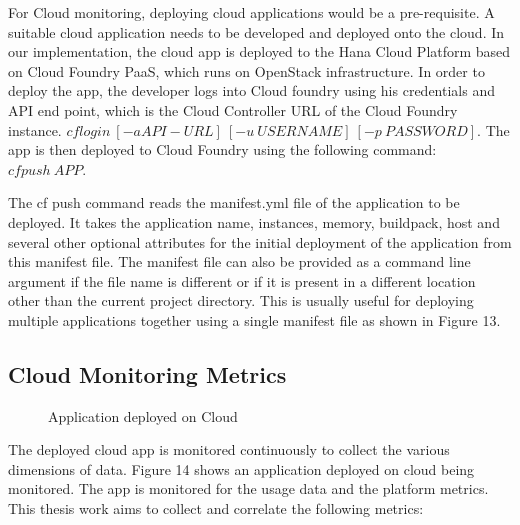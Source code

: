 \documentclass[article,type=msc,colorback,12pt,accentcolor=tud7b,table]{tudthesis}
\begin{document}
	For Cloud monitoring, deploying cloud applications would be a pre-requisite. A suitable cloud application needs to be developed and deployed onto the cloud. In our implementation, the cloud app is deployed to the Hana Cloud Platform based on Cloud Foundry PaaS, which runs on OpenStack \cite{openstack} infrastructure. In order to deploy the app, the developer logs into Cloud foundry using his credentials and API end point, which is the Cloud Controller URL of the Cloud Foundry instance. $ cf login \: [-a API-URL] \: [-u \: USERNAME] \: [-p \: PASSWORD] $. The app is then deployed to Cloud Foundry using the following command: $ cf push \: APP $.		

The cf push command reads the manifest.yml file of the application to be deployed. It takes the application name, instances, memory, buildpack, host and several other optional attributes for the initial deployment of the application from this manifest file. The manifest file can also be provided as a command line argument if the file name is different or if it is present in a different location other than the current project directory. This is usually useful for deploying multiple applications together using a single manifest file as shown in Figure 13.
	
\subsection{Cloud Monitoring Metrics} 

 \begin{figure}
 \begin{center}
  \makebox[\textwidth]{\texttt{[image: D1]}}
\end{center}
\caption{Application deployed on Cloud}
\end{figure}
	
The deployed cloud app is monitored continuously to collect the various dimensions of data. Figure 14 shows an application deployed on cloud being monitored. The app is monitored for the usage data and the platform metrics. This thesis work aims to collect and correlate the following metrics:
\end{document}
